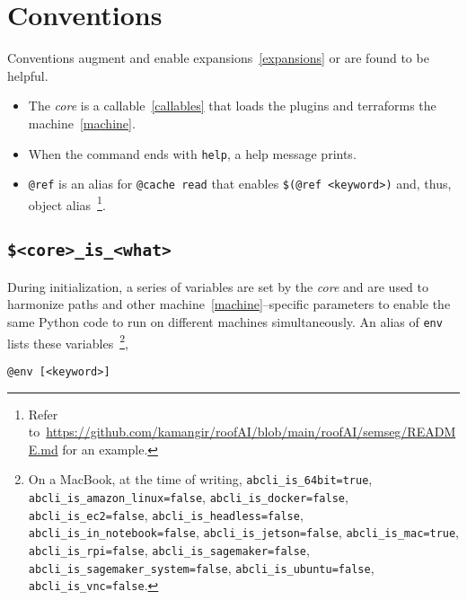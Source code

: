 \section{Conventions}
\label{conventions}

Conventions augment and enable expansions~\ref{expansions} or are found to be helpful.
%
\begin{itemize}
    \item The \emph{core} is a callable~\ref{callables} that loads the plugins and terraforms the machine~\ref{machine}.
    \item When the command ends with \texttt{help}, a help message prints.
    \item \texttt{@ref} is an alias for \texttt{@cache read} that enables \texttt{\$(@ref <keyword>)} and, thus, object alias~\footnote{Refer to~\url{https://github.com/kamangir/roofAI/blob/main/roofAI/semseg/README.md} for an example.}.
\end{itemize}  

\subsection{\texttt{\$<core>\_is\_<what>}}
\label{awareness}

During initialization, a series of variables are set by the \emph{core} and are used to harmonize paths and other machine~\ref{machine}--specific parameters to enable the same Python code to run on different machines simultaneously. An alias of \texttt{env} lists these variables~\footnote{On a MacBook, at the time of writing, \texttt{abcli\_is\_64bit=true}, \texttt{abcli\_is\_amazon\_linux=false}, \texttt{abcli\_is\_docker=false}, \texttt{abcli\_is\_ec2=false}, \texttt{abcli\_is\_headless=false}, \texttt{abcli\_is\_in\_notebook=false}, \texttt{abcli\_is\_jetson=false}, \texttt{abcli\_is\_mac=true}, \texttt{abcli\_is\_rpi=false}, \texttt{abcli\_is\_sagemaker=false}, \texttt{abcli\_is\_sagemaker\_system=false}, \texttt{abcli\_is\_ubuntu=false}, \texttt{abcli\_is\_vnc=false}.},
%
\begin{verbatim}
@env [<keyword>]
\end{verbatim}









